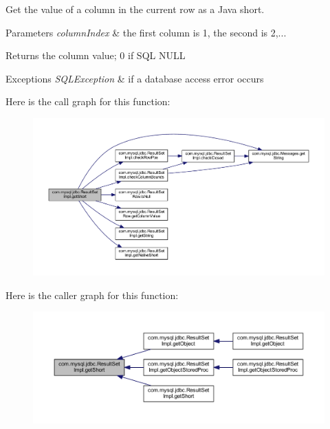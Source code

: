 Get the value of a column in the current row as a Java short.


\begin{DoxyParams}{Parameters}
{\em column\+Index} & the first column is 1, the second is 2,...\\
\hline
\end{DoxyParams}
\begin{DoxyReturn}{Returns}
the column value; 0 if S\+QL N\+U\+LL
\end{DoxyReturn}

\begin{DoxyExceptions}{Exceptions}
{\em S\+Q\+L\+Exception} & if a database access error occurs \\
\hline
\end{DoxyExceptions}
Here is the call graph for this function\+:
\nopagebreak
\begin{figure}[H]
\begin{center}
\leavevmode
\includegraphics[width=350pt]{classcom_1_1mysql_1_1jdbc_1_1_result_set_impl_ac1ce7614ffee29fc12680bf7dd00e689_cgraph}
\end{center}
\end{figure}
Here is the caller graph for this function\+:
\nopagebreak
\begin{figure}[H]
\begin{center}
\leavevmode
\includegraphics[width=350pt]{classcom_1_1mysql_1_1jdbc_1_1_result_set_impl_ac1ce7614ffee29fc12680bf7dd00e689_icgraph}
\end{center}
\end{figure}
\mbox{\label{classcom_1_1mysql_1_1jdbc_1_1_result_set_impl_af2d2439bfaa7c82a682b5f532a641cc8}} 
